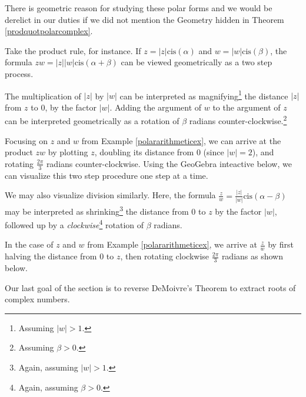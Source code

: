 \documentclass{ximera}
\begin{document}
 

There is geometric reason for studying these polar forms and we would be derelict in our duties if we did not mention the Geometry hidden in Theorem \ref{prodquotpolarcomplex}.  

 

Take the product rule, for instance. If $z = |z| \text{cis}(\alpha)$ and $w = |w| \text{cis}(\beta)$, the formula $zw = |z||w| \text{cis}(\alpha + \beta)$ can be viewed geometrically as a two step process. 

 

 The multiplication of $|z|$ by $|w|$ can be interpreted as magnifying\footnote{Assuming $|w| > 1$.} the distance $|z|$ from $z$ to $0$, by the factor $|w|$. Adding the argument of $w$ to the argument of $z$ can be interpreted geometrically as a rotation of $\beta$ radians counter-clockwise.\footnote{Assuming $\beta > 0$.} 
 
  
 
Focusing on $z$ and $w$ from Example \ref{polararithmeticex}, we can arrive at the product $zw$ by plotting $z$, doubling its distance from $0$ (since $|w| = 2$), and rotating $\frac{2\pi}{3}$ radians counter-clockwise.  Using the GeoGebra inteactive below, we can visualize this two step procedure one step at a time. 

\begin{center}
\end{center}

We may also visualize division similarly. Here, the formula  $\frac{z}{w} = \frac{|z|}{|w|} \text{cis}(\alpha - \beta)$ may be interpreted as shrinking\footnote{Again, assuming $|w| > 1$.} the distance from $0$ to $z$ by the factor $|w|$, followed up by a \textit{clockwise}\footnote{Again, assuming $\beta > 0$.} rotation of $\beta$ radians.  

 

In the case of $z$ and $w$ from Example \ref{polararithmeticex}, we arrive at $\frac{z}{w}$ by first halving the distance from $0$ to $z$, then rotating clockwise $\frac{2\pi}{3}$ radians as shown below.


\begin{center}
\end{center}

Our last goal of the section is to reverse DeMoivre's Theorem to extract roots of complex numbers.
\end{document}
